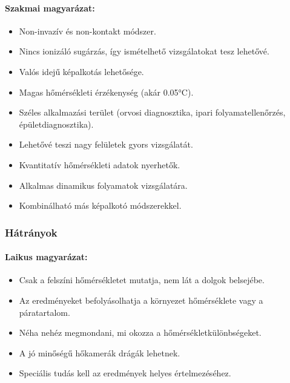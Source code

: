 \documentclass[a4paper,12pt]{article}
\begin{document}
\paragraph{Szakmai magyarázat:} \begin{itemize} \item Non-invazív és non-kontakt módszer. \item Nincs ionizáló sugárzás, így ismételhető vizsgálatokat tesz lehetővé. \item Valós idejű képalkotás lehetősége. \item Magas hőmérsékleti érzékenység (akár 0.05°C). \item Széles alkalmazási terület (orvosi diagnosztika, ipari folyamatellenőrzés, épületdiagnosztika). \item Lehetővé teszi nagy felületek gyors vizsgálatát. \item Kvantitatív hőmérsékleti adatok nyerhetők. \item Alkalmas dinamikus folyamatok vizsgálatára. \item Kombinálható más képalkotó módszerekkel. \end{itemize}

\subsubsection{Hátrányok}

\paragraph{Laikus magyarázat:} \begin{itemize} \item Csak a felszíni hőmérsékletet mutatja, nem lát a dolgok belsejébe. \item Az eredményeket befolyásolhatja a környezet hőmérséklete vagy a páratartalom. \item Néha nehéz megmondani, mi okozza a hőmérsékletkülönbségeket. \item A jó minőségű hőkamerák drágák lehetnek. \item Speciális tudás kell az eredmények helyes értelmezéséhez. \end{itemize}
\end{document}
